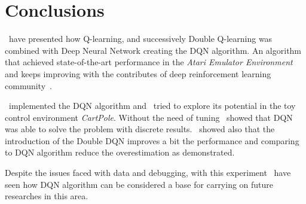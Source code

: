 \section{Conclusions}

\Auth~have presented how Q-learning, and successively Double Q-learning was combined with Deep Neural Network creating the DQN algorithm. 
An algorithm that achieved state-of-the-art performance in the \textit{Atari Emulator Environment} and keeps improving with the contributes of deep reinforcement learning community~\cite{DBLP:journals/corr/abs-1710-02298}.

\Auth~implemented the DQN algorithm and \auth~tried to explore its potential in the toy control environment \textit{CartPole}. Without the need of tuning \auth~showed that DQN was able to solve the problem with discrete results. \Auth~showed also that the introduction of the Double DQN improves a bit the performance and comparing to DQN algorithm reduce the overestimation as \citeauthor{Hasselt:2016:DRL:3016100.3016191}  demonstrated.

Despite the issues faced with data and debugging, with this experiment \auth~have seen how DQN algorithm can be considered a base for carrying on future researches in this area. 